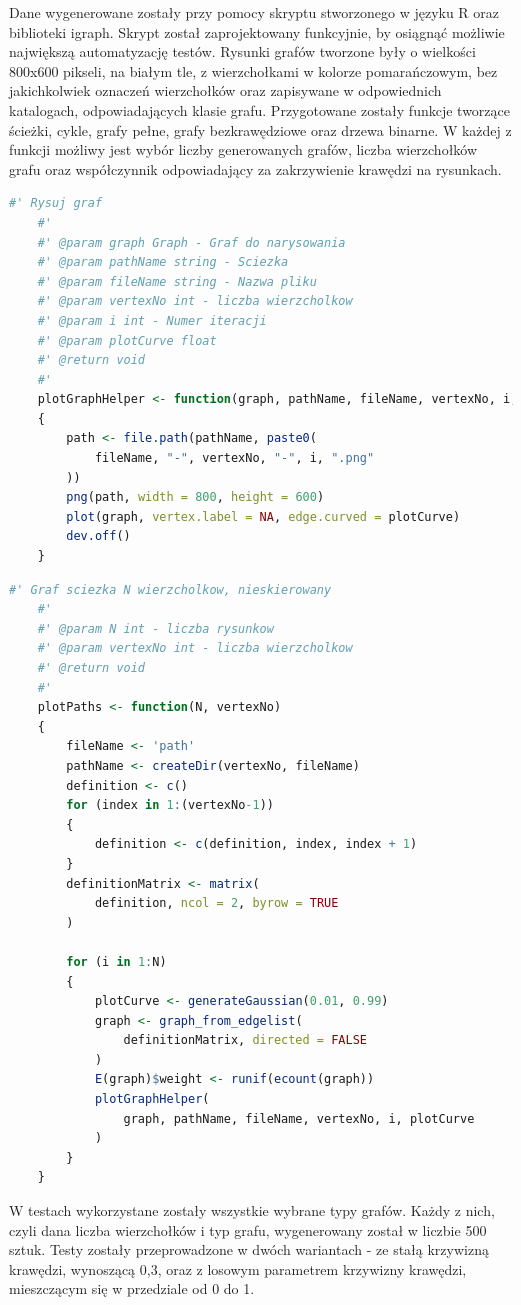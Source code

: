 Dane wygenerowane zostały przy pomocy skryptu stworzonego w języku R oraz biblioteki igraph.
Skrypt został zaprojektowany funkcyjnie, by osiągnąć możliwie największą automatyzację testów.
Rysunki grafów tworzone były o wielkości 800x600 pikseli, na białym tle, z wierzchołkami w kolorze pomarańczowym,
bez jakichkolwiek oznaczeń wierzchołków oraz zapisywane w odpowiednich katalogach, odpowiadających klasie grafu.
Przygotowane zostały funkcje tworzące ścieżki, cykle, grafy pełne, grafy bezkrawędziowe oraz drzewa binarne.
W każdej z funkcji możliwy jest wybór liczby generowanych grafów, liczba wierzchołków grafu
oraz współczynnik odpowiadający za zakrzywienie krawędzi na rysunkach.

\begin{lstlisting}[language=R,caption=Listing skryptu rysującego grafy,label={tests-generation-1}]
	#' Rysuj graf
	#'
	#' @param graph Graph - Graf do narysowania
	#' @param pathName string - Sciezka
	#' @param fileName string - Nazwa pliku
	#' @param vertexNo int - liczba wierzcholkow
	#' @param i int - Numer iteracji
	#' @param plotCurve float
	#' @return void
	#'
	plotGraphHelper <- function(graph, pathName, fileName, vertexNo, i, plotCurve)
	{
		path <- file.path(pathName, paste0(
			fileName, "-", vertexNo, "-", i, ".png"
		))
		png(path, width = 800, height = 600)
		plot(graph, vertex.label = NA, edge.curved = plotCurve)
		dev.off()
	}	
\end{lstlisting}

\begin{lstlisting}[language=R,caption=Listing funkcji tworzącej ścieżkę,label={tests-generation-2}]
	#' Graf sciezka N wierzcholkow, nieskierowany
	#'
	#' @param N int - liczba rysunkow
	#' @param vertexNo int - liczba wierzcholkow
	#' @return void
	#'
	plotPaths <- function(N, vertexNo)
	{
		fileName <- 'path'
		pathName <- createDir(vertexNo, fileName)
		definition <- c()
		for (index in 1:(vertexNo-1))
		{
			definition <- c(definition, index, index + 1)
		}
		definitionMatrix <- matrix(
			definition, ncol = 2, byrow = TRUE
		)
		
		for (i in 1:N)
		{
			plotCurve <- generateGaussian(0.01, 0.99)
			graph <- graph_from_edgelist(
				definitionMatrix, directed = FALSE
			)
			E(graph)$weight <- runif(ecount(graph))
			plotGraphHelper(
				graph, pathName, fileName, vertexNo, i, plotCurve
			)
		}
	}
\end{lstlisting}

W testach wykorzystane zostały wszystkie wybrane typy grafów.
Każdy z nich, czyli dana liczba wierzchołków i typ grafu, wygenerowany został w liczbie 500 sztuk.
Testy zostały przeprowadzone w dwóch wariantach - ze stałą krzywizną krawędzi, wynoszącą 0,3,
oraz z losowym parametrem krzywizny krawędzi, mieszczącym się w przedziale od 0 do 1.


